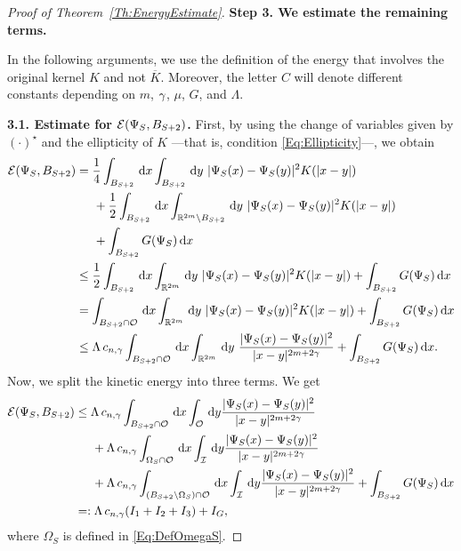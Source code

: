 \begin{proof}[Proof of Theorem~\ref{Th:EnergyEstimate}]
\textbf{Step 3. We estimate the remaining terms.}

In the following arguments, we use the definition of the energy that involves the original kernel $K$ and not $\overline{K}$. Moreover, the letter $C$ will denote different constants depending on $m$, $\gamma$, $\mu$, $G$, and $\Lambda$.

\textbf{3.1. Estimate for $\mathcal{E}(\Psi_S,B_{S+2})$.}
First, by using the change of variables given by $(\cdot)^\star$ and the ellipticity of $K$ ---that is, condition \eqref{Eq:Ellipticity}---, we obtain
\begin{align*}
\ecal(\Psi_S,B_{S+2}) &= \frac{1}{4} \int_{B_{S+2}} \d x \int_{B_{S+2}} \d y\ |\Psi_S(x)-\Psi_S(y)|^2K(|x-y|)  \\
&\hspace{5mm} +\frac{1}{2} \int_{B_{S+2}} \d x \int_{\R^{2m} \setminus B_{S+2}} \d y \ |\Psi_S(x)-\Psi_S(y)|^2K(|x-y|) \\
&\hspace{5mm} + \int_{B_{S+2}} G(\Psi_S)  \d x\\
&\leq \frac{1}{2} \int_{B_{S+2}} \d x \int_{\R^{2m}} \d y\ |\Psi_S(x)-\Psi_S(y)|^2K(|x-y|) + \int_{B_{S+2}} G(\Psi_S) \d x \\
&= \int_{B_{S+2} \cap \ocal} \d x \int_{\R^{2m}} \d y\ |\Psi_S(x)-\Psi_S(y)|^2K(|x-y|)  + \int_{B_{S+2}} G(\Psi_S) \d x \\
&\leq \Lambda\, c_{n,\s} \int_{B_{S+2} \cap \ocal} \d x \int_{\R^{2m}} \d y \ \frac{|\Psi_S(x)-\Psi_S(y)|^2}{|x-y|^{2m+2\s}} + \int_{B_{S+2}} G(\Psi_S) \d x.
\end{align*}
Now, we split the kinetic energy into three terms. We get
\begin{align*}
\mathcal{E}(\Psi_S,B_{S+2}) &\leq \Lambda\, c_{n,\gamma} \int_{B_{S+2} \cap \mathcal{O}} \,\mathrm{d} x \int_{\mathcal{O}} \,\mathrm{d} y \frac{|\Psi_S(x)-\Psi_S(y)|^2}{|x-y|^{2m+2\gamma}} \\
&\hspace{5mm} + \Lambda\, c_{n,\gamma} \int_{\Omega_S \cap \mathcal{O}} \,\mathrm{d} x \int_{\mathcal{I}} \,\mathrm{d} y \frac{|\Psi_S(x)-\Psi_S(y)|^2}{|x-y|^{2m+2\gamma}} \\
&\hspace{5mm} + \Lambda\, c_{n,\gamma} \int_{(B_{S+2}\setminus \Omega_S) \cap \mathcal{O}} \,\mathrm{d} x \int_{\mathcal{I}} \,\mathrm{d} y \frac{|\Psi_S(x)-\Psi_S(y)|^2}{|x-y|^{2m+2\gamma}} + \int_{B_{S+2}} G(\Psi_S) \,\mathrm{d} x\\
&=:\Lambda\, c_{n,\gamma} (I_1+I_2+I_3)+I_G,
\end{align*}
where $\Omega_S$ is defined in \eqref{Eq:DefOmegaS}. 


\end{proof}
